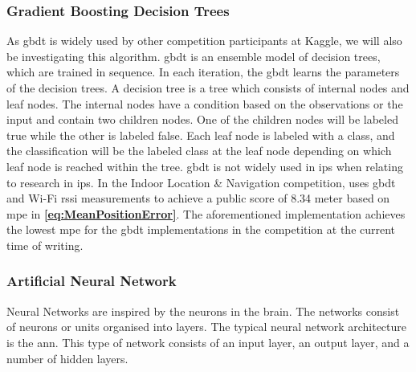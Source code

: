 \subsubsection{Gradient Boosting Decision Trees}
As \gls{gbdt} is widely used by other competition participants at Kaggle, we will also be investigating this algorithm.
\gls{gbdt} is an ensemble model of decision trees, which are trained in sequence. In each iteration, the \gls{gbdt} learns the parameters of the decision trees. A decision tree is a tree which consists of internal nodes and leaf nodes. The internal nodes have a condition based on the observations or the input and contain two children nodes. One of the children nodes will be labeled true while the other is labeled false. Each leaf node is labeled with a class, and the classification will be the labeled class at the leaf node depending on which leaf node is reached within the tree.\cite{AIBook}
\gls{gbdt} is not widely used in \gls{ips} when relating to research in \gls{ips}. In the Indoor Location \& Navigation competition, \cite{lgbmKaggle01} uses \gls{gbdt} and Wi-Fi \gls{rssi} measurements to achieve a public score of 8.34 meter based on \gls{mpe} in \textbf{\autoref{eq:MeanPositionError}}. The aforementioned implementation achieves the lowest \gls{mpe} for the \gls{gbdt} implementations in the competition at the current time of writing.

\subsubsection{Artificial Neural Network}
Neural Networks are inspired by the neurons in the brain. The networks consist of neurons or units organised into layers. The typical neural network architecture is the \gls{ann}. This type of network consists of an input layer, an output layer, and a number of hidden layers\cite{AIBook}.

